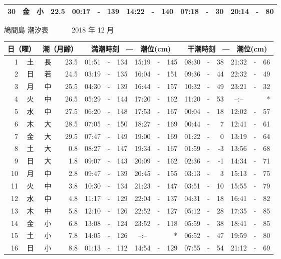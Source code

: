 \documentclass[12pt.a4j]{jsarticle}
\begin{document}
\begin{center}
\begin{table}[ht]
\begin{tabular}{|rc|cr|ccrccr|ccrccr|}
30 & 金 & 小 & 22.5 & 00:17 &-& 139 & 14:22 &-& 140 & 07:18 &-&  30 & 20:14 &-&  80 \\
\hline
\end{tabular}
\end{table}
\newpage
{\LARGE 鳩間島  潮汐表　　　}
{\large 2018 年 12 月}\\
\begin{table}[ht]
\begin{tabular}{|rc|cr|ccrccr|ccrccr|}
\hline
\multicolumn{2}{|c|}{日（曜）} & \multicolumn{2}{c|}{潮（月齢）} & \multicolumn{6}{c|}{満潮時刻　―　潮位(cm)} & \multicolumn{6}{c|}{干潮時刻　―　潮位(cm)} \\
\hline
 1 & 土 & 長 & 23.5 & 01:51 &-& 134 & 15:19 &-& 145 & 08:30 &-&  38 & 21:32 &-&  66 \\
 2 & 日 & 若 & 24.5 & 03:19 &-& 135 & 16:04 &-& 151 & 09:36 &-&  44 & 22:32 &-&  49 \\
 3 & 月 & 中 & 25.5 & 04:30 &-& 139 & 16:44 &-& 157 & 10:32 &-&  49 & 23:21 &-&  32 \\
 4 & 火 & 中 & 26.5 & 05:29 &-& 144 & 17:20 &-& 162 & 11:20 &-&  53 & --:-- & &  *  \\
 5 & 水 & 中 & 27.5 & 06:20 &-& 148 & 17:53 &-& 167 & 00:04 &-&  18 & 12:02 &-&  57 \\
 6 & 木 & 大 & 28.5 & 07:05 &-& 150 & 18:27 &-& 169 & 00:44 &-&   7 & 12:41 &-&  61 \\
 7 & 金 & 大 & 29.5 & 07:47 &-& 149 & 19:00 &-& 169 & 01:22 &-&   0 & 13:19 &-&  64 \\
 8 & 土 & 大 &  0.8 & 08:27 &-& 147 & 19:34 &-& 167 & 01:59 &-&  -3 & 13:56 &-&  68 \\
 9 & 日 & 大 &  1.8 & 09:07 &-& 143 & 20:09 &-& 162 & 02:36 &-&  -1 & 14:34 &-&  71 \\
10 & 月 & 中 &  2.8 & 09:47 &-& 139 & 20:45 &-& 155 & 03:13 &-&   3 & 15:13 &-&  75 \\
11 & 火 & 中 &  3.8 & 10:30 &-& 134 & 21:23 &-& 147 & 03:51 &-&  10 & 15:55 &-&  79 \\
12 & 水 & 中 &  4.8 & 11:17 &-& 129 & 22:04 &-& 137 & 04:31 &-&  18 & 16:41 &-&  82 \\
13 & 木 & 中 &  5.8 & 12:10 &-& 126 & 22:52 &-& 127 & 05:12 &-&  28 & 17:35 &-&  85 \\
14 & 金 & 小 &  6.8 & 13:08 &-& 124 & 23:52 &-& 118 & 05:59 &-&  38 & 18:41 &-&  85 \\
15 & 土 & 小 &  7.8 & 14:05 &-& 126 & --:-- & &  *  & 06:52 &-&  47 & 19:59 &-&  80 \\
16 & 日 & 小 &  8.8 & 01:13 &-& 112 & 14:54 &-& 129 & 07:55 &-&  54 & 21:12 &-&  69 \\

\end{tabular}
\end{table}
\end{center}
\end{document}
